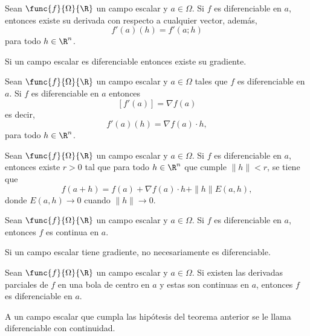 \documentclass[a4,11pt]{aleph-notas}
\begin{document}
\begin{prop}
    Sean $\func{f}{\Omega}{\R}$ un campo escalar y $a\in \Omega$. Si $f$ es diferenciable en $a$, entonces existe su derivada con respecto a cualquier vector, además,
    \[
        f'(a)(h)=f'(a;h)
    \]
    para todo $h\in\R^n$.
\end{prop}

\begin{advertencia}
    Si un campo escalar es diferenciable entonces existe su gradiente.
\end{advertencia}

\begin{teo}
    Sean $\func{f}{\Omega}{\R}$ un campo escalar y $a\in \Omega$ tales que $f$ es diferenciable en $a$. Si $f$ es diferenciable en $a$ entonces
    \[
        [f'(a)]=\nabla f(a)
    \]
    es decir, 
    \[
        f'(a)(h)=\nabla f(a)\cdot h,
    \]
    para todo $h\in\R^n$.
\end{teo}

\begin{prop}
    Sean $\func{f}{\Omega}{\R}$ un campo escalar y $a\in \Omega$. Si $f$ es diferenciable en $a$, entonces existe $r>0$ tal que para todo $h\in\R^n$ que cumple $\|h\|<r$, se tiene que
    \[
        f(a+h)=f(a)+\nabla f(a)\cdot h+\|h\|E(a,h),
    \]
    donde $E(a,h)\to 0$ cuando $\|h\|\to 0$.
\end{prop}

\begin{teo}
    Sean $\func{f}{\Omega}{\R}$ un campo escalar y $a\in \Omega$. Si $f$ es diferenciable en $a$, entonces $f$ es continua en $a$.
\end{teo}

\begin{advertencia}
    Si un campo escalar tiene gradiente, no necesariamente es diferenciable.
\end{advertencia}

\begin{teo}
    Sean $\func{f}{\Omega}{\R}$ un campo escalar y $a\in \Omega$. Si existen las derivadas parciales de $f$ en una bola de centro en $a$ y estas son continuas en $a$, entonces $f$ es diferenciable en $a$.
\end{teo}

\begin{advertencia}
    A un campo escalar que cumpla las hipótesis del teorema anterior se le llama diferenciable con continuidad.
\end{advertencia}
\end{document}

